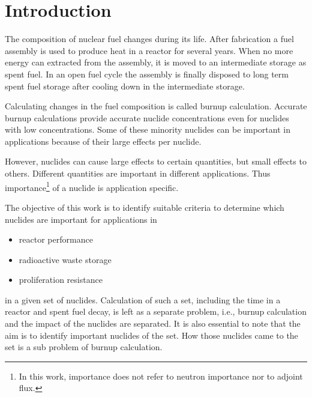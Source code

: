 \section{Introduction}

The composition of nuclear fuel changes during its life. After fabrication a fuel assembly is used to produce heat in a reactor for several years. When no more energy can extracted from the assembly, it is moved to an intermediate storage as spent fuel. In an open fuel cycle the assembly is finally disposed to long term spent fuel storage after cooling down in the intermediate storage.

Calculating changes in the fuel composition is called burnup calculation. %
Accurate burnup calculations provide accurate nuclide concentrations even for nuclides with low concentrations. Some of these minority nuclides can be important in applications because of their large effects per nuclide. 

However, nuclides can cause large effects to certain quantities, but small effects to others. Different quantities are important in different applications. Thus importance\footnote{In this work, importance does not refer to neutron importance nor to adjoint flux.} of a nuclide is application specific.



The objective of this work is to identify suitable criteria to determine which nuclides are important for applications in
\begin{itemize}
	\item reactor performance
	\item radioactive waste storage
	\item proliferation resistance
\end{itemize}
in a given set of nuclides. Calculation of such a set, including the time in a reactor and spent fuel decay, is left as a separate problem, i.e., burnup calculation and the impact of the nuclides are separated. It is also essential to note that the aim is to identify important nuclides of the set. How those nuclides came to the set is a sub problem of burnup calculation.

